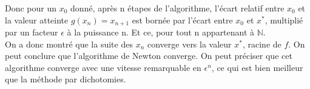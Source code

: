 \documentclass{article}
\begin{document}
	Donc pour un $x_{0}$ donné, après n étapes de l'algorithme, l'écart relatif entre $x_{0}$ et la valeur atteinte $g(x_{n})=x_{n+1}$ est bornée par l'écart entre $x_{0}$ et $x^{*}$, multiplié par un facteur $\epsilon$ à la puissance n.
	Et ce, pour tout n appartenant à $\mathbb{N}$.\\
	
	On a donc montré que la suite des $x_{n}$ converge vers la valeur $x^{*}$, racine de $f$. On peut conclure que l'algorithme de Newton converge. On peut préciser que cet algorithme converge avec une vitesse remarquable en $\epsilon^{n}$, ce qui est bien meilleur que la méthode par dichotomies.
	
\end{document}
